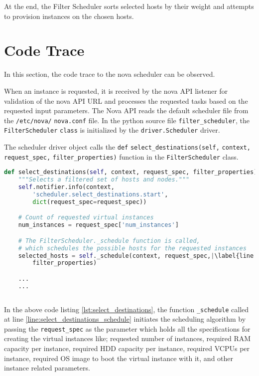 At the end, the Filter Scheduler sorts selected hosts by their weight and attempts to provision instances on the chosen hosts.

\newpage

\section{Code Trace}\label{sec:codetrace}

In this section, the code trace to the nova scheduler can be observed.

When an instance is requested, it is received by the nova API listener for validation of the nova API URL and processes the requested tasks based on the requested input parameters.
The Nova API reads the default scheduler file from the \verb|/etc/|\verb|nova/| \verb|nova.conf| file.
In the python source file \verb|filter_scheduler|, the \verb|FilterScheduler| \verb|class| is initialized by the \verb|driver.Scheduler| driver.

The scheduler driver object calls the \verb|def| \verb|select_destinations(self,| \verb|context,| \verb|request_spec,| \verb|filter_properties)| function in the \verb|FilterScheduler| class.
\newline
\begin{lstlisting}[frame=single, language=Python, caption={The function select\_destination},label={lst:select_destinations}, escapechar=|]
def select_destinations(self, context, request_spec, filter_properties):
	"""Selects a filtered set of hosts and nodes."""
	self.notifier.info(context,
		'scheduler.select_destinations.start',
		dict(request_spec=request_spec))

	# Count of requested virtual instances
	num_instances = request_spec['num_instances']

	# The FilterScheduler._schedule function is called,
	# which schedules the possible hosts for the requested instances
	selected_hosts = self._schedule(context, request_spec,|\label{line:select_destinations_schedule}|
		filter_properties)

	...
	...
	
\end{lstlisting}

In the above code listing \ref{lst:select_destinations}, the function \verb|_schedule| called at line \ref{line:select_destinations_schedule}
initiates the scheduling algorithm by passing the \verb|request_spec| as the parameter which holds all the specifications for creating the virtual instances like; requested number of instances, required RAM capacity per instance, required HDD capacity per instance, required VCPUs per instance, required OS image to boot the virtual instance with it, and other instance related parameters.

